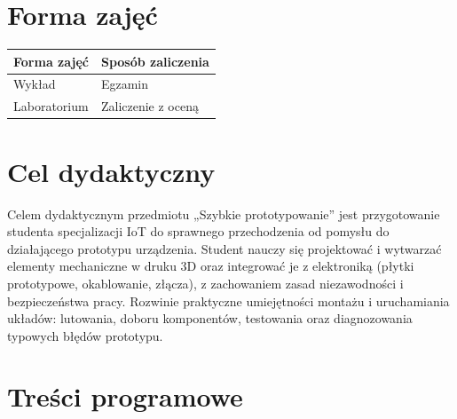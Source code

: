 \documentclass[12pt, a4paper]{article}
\begin{document}
\section{Forma zajęć}

\begin{tabular}{ll}
  \hline
  \textbf{Forma zajęć} & \textbf{Sposób zaliczenia} \\
  \hline
  Wykład & Egzamin \\
  Laboratorium & Zaliczenie z oceną \\
  \hline
\end{tabular}

\section{Cel dydaktyczny}

Celem dydaktycznym przedmiotu „Szybkie prototypowanie” jest przygotowanie studenta specjalizacji IoT do sprawnego przechodzenia od pomysłu do działającego prototypu urządzenia. Student nauczy się projektować i wytwarzać elementy mechaniczne w druku 3D oraz integrować je z elektroniką (płytki prototypowe, okablowanie, złącza), z zachowaniem zasad niezawodności i bezpieczeństwa pracy. Rozwinie praktyczne umiejętności montażu i uruchamiania układów: lutowania, doboru komponentów, testowania oraz diagnozowania typowych błędów prototypu.

\section{Treści programowe}
\end{document}
